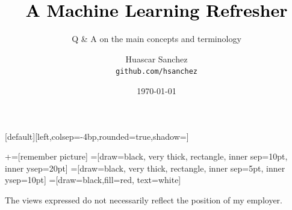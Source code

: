

\usepackage{framed}
\usepackage[inline]{enumitem}
\usepackage[backend=bibtex]{biblatex}
\usepackage{amssymb}
\usepackage{amsmath}
\usepackage{gensymb}  %
\usepackage{dirtytalk} %

\newcommand{\norm}[1]{\left\lVert #1 \right\rVert}

\usepackage{multirow}
\usepackage{booktabs}

\usepackage{mathtools}
\providecommand\given{}
\DeclarePairedDelimiterXPP\Aver[1]{\mathbb{E}}{[}{]}{}{
\renewcommand\given{  \nonscript\:
  \delimsize\vert
  \nonscript\:
  \mathopen{}
  \allowbreak}
#1
}


\title[]{\Huge \textbf{\textcolor{black}{A Machine Learning Refresher}}}
\subtitle{\Large Q \& A on the main concepts and terminology}
\author[HAS]{
\parbox[t]{1.5in}{Huascar Sanchez \\\small\texttt{github.com/hsanchez}} %
}

\date{\today}

\makeatletter
{}[default][left,colsep=-4bp,rounded=true,shadow=\beamer@themerounded@shadow]
\makeatother


\newcommand\marktopleft[1]{%
    \tikz[overlay,remember picture]
        \node (marker-#1-a) at (-.3em,.3em) {};%
}
\newcommand\markbottomright[2]{%
    \tikz[overlay,remember picture]
        \node (marker-#1-b) at (0em,0em) {};%
}
+=[remember picture]
 =[draw=black, very thick, rectangle, inner sep=10pt, inner ysep=20pt]
 =[draw=black, very thick, rectangle, inner sep=5pt, inner ysep=10pt]
 =[draw=black,fill=red, text=white]

\begin{frame}
\maketitle
\tiny\hspace{1em}The views expressed do not necessarily reflect the position of my employer.
\end{frame}

